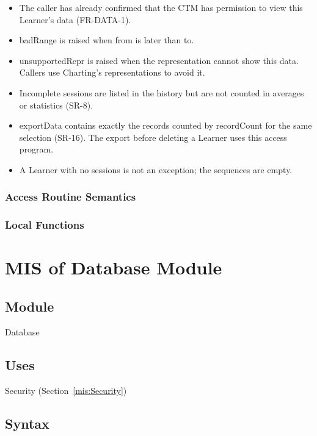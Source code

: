 \documentclass[12pt, titlepage]{article}
\newcommand{\Mref}[1]{Section~\ref{#1}}
\begin{document}
\begin{itemize}
\item The caller has already confirmed that the CTM has permission to view this
  Learner's data (FR-DATA-1).
\item badRange is raised when from is later than to.
\item unsupportedRepr is raised when the representation cannot show this data.
  Callers use Charting's representations to avoid it.
\item Incomplete sessions are listed in the history but are not counted in
  averages or statistics (SR-8).
\item exportData contains exactly the records counted by recordCount for the
  same selection (SR-16). The export before deleting a Learner uses this
  access program.
\item A Learner with no sessions is not an exception; the sequences are empty.
\end{itemize}

\subsubsection{Access Routine Semantics}

\subsubsection{Local Functions}

\newpage

\section{MIS of Database Module} \label{mis:Database}

\subsection{Module}

Database

\subsection{Uses}

Security (\Mref{mis:Security})

\subsection{Syntax}
\end{document}
